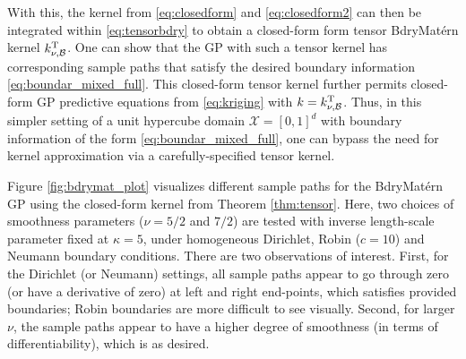 \documentclass[aos,preprint]{imsart}
\theoremstyle{plain}
\theoremstyle{remark}
\begin{document}
With this, the kernel from \eqref{eq:closedform} and \eqref{eq:closedform2} can then be integrated within \eqref{eq:tensorbdry} to obtain a closed-form form tensor BdryMat\'ern kernel $k_{\nu,\mathcal{B}}^{\rm T}$. One can show that the GP with such a tensor kernel has corresponding sample paths that satisfy the desired boundary information \eqref{eq:boundar_mixed_full}. This closed-form tensor kernel further permits closed-form GP predictive equations from \eqref{eq:kriging} with $k = k_{\nu,\mathcal{B}}^{\rm T}$. Thus, in this simpler setting of a unit hypercube domain $\mathcal{X} = [0,1]^d$ with boundary information of the form \eqref{eq:boundar_mixed_full}, one can bypass the need for kernel approximation via a carefully-specified tensor kernel.



Figure \ref{fig:bdrymat_plot} visualizes different sample paths for the BdryMat\'ern GP using the closed-form kernel from Theorem \ref{thm:tensor}. Here, two choices of smoothness parameters ($\nu = 5/2$ and $7/2$) are tested with inverse length-scale parameter fixed at $\kappa = 5$, under homogeneous Dirichlet, Robin ($c=10$) and Neumann boundary conditions. There are two observations of interest. First, for the Dirichlet (or Neumann) settings, all sample paths appear to go through zero (or have a derivative of zero) at left and right end-points, which satisfies provided boundaries; Robin boundaries are more difficult to see visually. Second, for larger $\nu$, the sample paths appear to have a higher degree of smoothness (in terms of differentiability), which is as desired.


\end{document}
